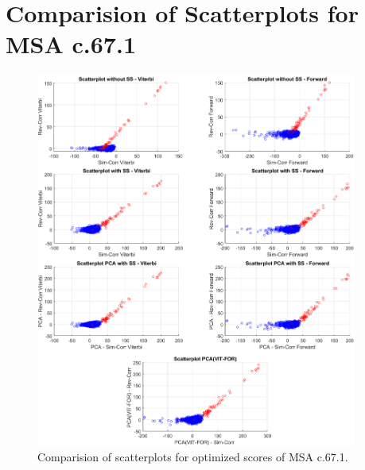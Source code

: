 \chapter{Comparision of Scatterplots for MSA c.67.1 }
\label{app:APPPCAcorrScores}

\begin{figure}[ht]
	\begin{center}
		\includegraphics[width=0.94\textwidth]{tex/append/APP_SCATTER_c_67_1_v1}
	\end{center}
	\caption{Comparision of scatterplots for optimized scores of \acs{MSA} c.67.1.}
	\label{fig:APPSCATTERCOMPXX}
\end{figure} 